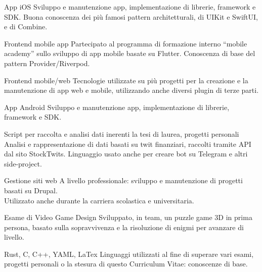 \documentclass[
	a4paper,
]{fortysecondscv}
\begin{document}
\begin{cvtable}[2.5]
        {App iOS}
        {}
        {Sviluppo e manutenzione app, implementazione di librerie, framework e SDK. Buona conoscenza dei più famosi pattern architetturali, di UIKit e SwiftUI, e di Combine.}
        
        {Frontend mobile app}
        {}
        {Partecipato al programma di formazione interno ``mobile academy'' sullo sviluppo di app mobile basate su Flutter. Conoscenza di base del pattern Provider/Riverpod.}

        {Frontend mobile/web}
        {}
        {Tecnologie utilizzate su più progetti per la creazione e la manutenzione di app web e mobile, utilizzando anche diversi plugin di terze parti.}
    
        {App Android}
        {}
        {Sviluppo e manutenzione app, implementazione di librerie, framework e SDK.}
    
        {Script per raccolta e analisi dati inerenti la tesi di laurea, progetti personali}
        {}
        {Analisi e rappresentazione di dati basati su twit finanziari, raccolti tramite API dal sito StockTwits. Linguaggio usato anche per creare bot su Telegram e altri side-project.}
    
        {Gestione siti web}
        {}
        {A livello professionale: sviluppo e manutenzione di progetti basati su Drupal.\\Utilizzato anche durante la carriera scolastica e universitaria.}
    
        {Esame di Video Game Design}
        {}
        {Sviluppato, in team, un puzzle game 3D in prima persona, basato sulla sopravvivenza e la risoluzione di enigmi per avanzare di livello.}
    
        {Rust, C, C++, YAML, LaTex}
        {}
        {Linguaggi utilizzati al fine di superare vari esami, progetti personali o la stesura di questo Curriculum Vitae: conoscenze di base.}
\end{cvtable}

\cvsignature

\let\thefootnote\relax{}
\end{document}
